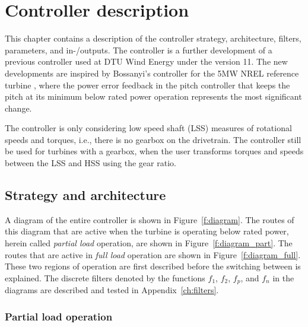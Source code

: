 \chapter{Controller description} \label{cha:description}

This chapter contains a description of the controller strategy, architecture, filters, parameters, and in-/outputs. The controller is a further development of a previous controller used at DTU Wind Energy under the version 11. The new developments are inspired by Bossanyi's controller for the 5MW NREL reference turbine \cite{Bossanyi09}, where the power error feedback in the pitch controller that keeps the pitch at its minimum below rated power operation represents the most significant change.

The controller is only considering low speed shaft (LSS) measures of rotational speeds and torques, i.e., there is no gearbox on the drivetrain. The controller still be used for turbines with a gearbox, when the user transforms torques and speeds between the LSS and HSS using the gear ratio.

\section{Strategy and architecture}

A diagram of the entire controller is shown in Figure~\ref{f:diagram}. The routes of this diagram that are active when the turbine is operating below rated power, herein called \emph{partial load} operation, are shown in Figure~\ref{f:diagram_part}. The routes that are active in \emph{full load} operation are shown in Figure~\ref{f:diagram_full}. These two regions of operation are first described before the switching between is explained. The discrete filters denoted by the functions $f_1$, $f_2$, $f_p$, and $f_n$ in the diagrams are described and tested in Appendix~\ref{ch:filters}.

\subsection{Partial load operation}

